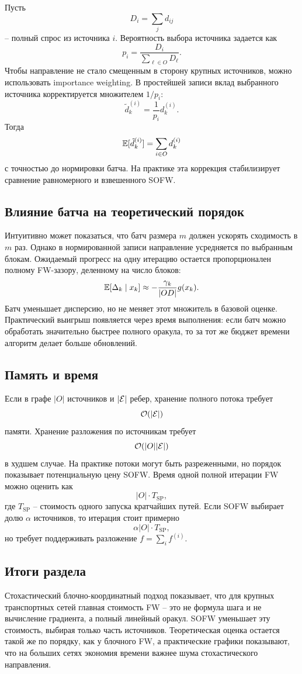 Пусть
\[
    D_i=\sum_j d_{ij}
\]
-- полный спрос из источника $i$.
Вероятность выбора источника задается как
\[
    p_i=\frac{D_i}{\sum_{\ell\in O}D_\ell}.
\]
Чтобы направление не стало смещенным в сторону крупных источников, можно использовать
importance weighting.
В простейшей записи вклад выбранного источника корректируется множителем $1/p_i$:
\[
    \tilde d_k^{(i)}=\frac{1}{p_i}d_k^{(i)}.
\]
Тогда
\[
    \mathbb{E}[\tilde d_k^{(i)}]=\sum_{i\in O}d_k^{(i)}
\]
с точностью до нормировки батча.
На практике эта коррекция стабилизирует сравнение равномерного и взвешенного SOFW.

\subsection{Влияние батча на теоретический порядок}

Интуитивно может показаться, что батч размера $m$ должен ускорять сходимость в $m$ раз.
Однако в нормированной записи направление усредняется по выбранным блокам.
Ожидаемый прогресс на одну итерацию остается пропорционален полному FW-зазору, деленному
на число блоков:
\[
    \mathbb{E}[\Delta_k\mid x_k]\approx -\frac{\gamma_k}{|OD|}g(x_k).
\]
Батч уменьшает дисперсию, но не меняет этот множитель в базовой оценке.
Практический выигрыш появляется через время выполнения:
если батч можно обработать значительно быстрее полного оракула, то за тот же бюджет времени
алгоритм делает больше обновлений.

\subsection{Память и время}

Если в графе $|O|$ источников и $|\mathcal{E}|$ ребер, хранение полного потока требует
\[
    \mathcal{O}(|\mathcal{E}|)
\]
памяти.
Хранение разложения по источникам требует
\[
    \mathcal{O}(|O||\mathcal{E}|)
\]
в худшем случае.
На практике потоки могут быть разреженными, но порядок показывает потенциальную цену SOFW.
Время одной полной итерации FW можно оценить как
\[
    |O|\cdot T_{\mathrm{SP}},
\]
где $T_{\mathrm{SP}}$ -- стоимость одного запуска кратчайших путей.
Если SOFW выбирает долю $\alpha$ источников, то итерация стоит примерно
\[
    \alpha |O|\cdot T_{\mathrm{SP}},
\]
но требует поддерживать разложение $f=\sum_i f^{(i)}$.

\subsection{Итоги раздела}

Стохастический блочно-координатный подход показывает, что для крупных транспортных сетей главная стоимость FW -- это
не формула шага и не вычисление градиента, а полный линейный оракул.
SOFW уменьшает эту стоимость, выбирая только часть источников.
Теоретическая оценка остается такой же по порядку, как у блочного FW, а практические графики
показывают, что на больших сетях экономия времени важнее шума стохастического направления.
